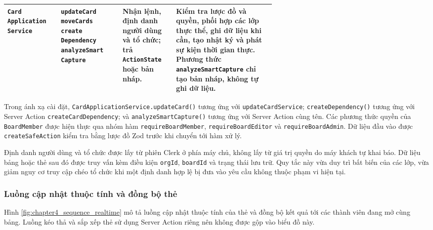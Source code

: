 \documentclass[../DoAn.tex]{subfiles}
\begin{document}
\begin{table}[H]
\begin{tabularx}{\linewidth}{|>{\raggedright\arraybackslash}p{0.20\linewidth}|>{\raggedright\arraybackslash}p{0.23\linewidth}|>{\raggedright\arraybackslash}p{0.20\linewidth}|X|}
        \texttt{Card}\newline
        \texttt{Application}\newline
        \texttt{Service}
        &
        \texttt{updateCard}\newline
        \texttt{moveCards}\newline
        \texttt{create}\newline
        \texttt{Dependency}\newline
        \texttt{analyzeSmart}\newline
        \texttt{Capture}
        &
        Nhận lệnh, định danh người dùng và tổ chức; trả \texttt{ActionState} hoặc bản nháp.
        &
        Kiểm tra lược đồ và quyền, phối hợp các lớp thực thể, ghi dữ liệu khi cần, tạo nhật ký và phát sự kiện thời gian thực. Phương thức \texttt{analyzeSmartCapture} chỉ tạo bản nháp, không tự ghi dữ liệu. \\ \hline
    \end{tabularx}
\end{table}

Trong ánh xạ cài đặt, \texttt{CardApplicationService.updateCard()} tương ứng với \texttt{updateCardService}; \texttt{createDependency()} tương ứng với Server Action \texttt{createCardDependency}; và \texttt{analyzeSmartCapture()} tương ứng với Server Action cùng tên. Các phương thức quyền của \texttt{BoardMember} được hiện thực qua nhóm hàm \texttt{requireBoardMember}, \texttt{requireBoardEditor} và \texttt{requireBoardAdmin}. Dữ liệu đầu vào được \texttt{createSafeAction} kiểm tra bằng lược đồ Zod trước khi chuyển tới hàm xử lý.

Định danh người dùng và tổ chức được lấy từ phiên Clerk ở phía máy chủ, không lấy từ giá trị quyền do máy khách tự khai báo. Dữ liệu bảng hoặc thẻ sau đó được truy vấn kèm điều kiện \texttt{orgId}, \texttt{boardId} và trạng thái lưu trữ. Quy tắc này vừa duy trì bất biến của các lớp, vừa giảm nguy cơ truy cập chéo tổ chức khi một định danh hợp lệ bị đưa vào yêu cầu không thuộc phạm vi hiện tại.

\subsubsection{Luồng cập nhật thuộc tính và đồng bộ thẻ}
\label{subsubsection:4.2.2.c}

Hình \ref{fig:chapter4_sequence_realtime} mô tả luồng cập nhật thuộc tính của thẻ và đồng bộ kết quả tới các thành viên đang mở cùng bảng. Luồng kéo thả và sắp xếp thẻ sử dụng Server Action riêng nên không được gộp vào biểu đồ này.
\end{document}
